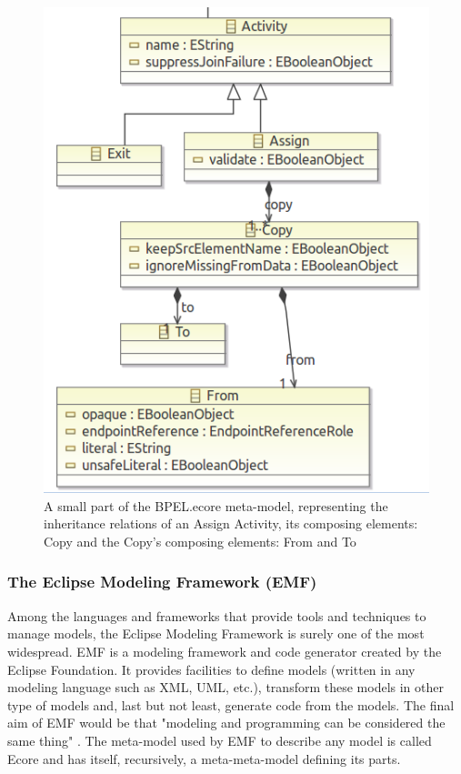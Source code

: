 \begin{figure}
  \begin{center}
    \includegraphics[scale=0.5]{pictures/BPELMetaModelExample.png}
    \caption{A small part of the BPEL.ecore meta-model, representing the inheritance relations of an Assign Activity, its composing elements: Copy and the Copy's composing elements: From and To}
    \label{BPELEcoreExample}
  \end{center}
\end{figure}

\subsubsection{The Eclipse Modeling Framework (EMF)}
\label{EMF}
Among the languages and frameworks that provide tools and techniques to manage models, the Eclipse Modeling Framework is surely one of the most widespread. 
EMF is a modeling framework and code generator created by the Eclipse Foundation. It provides facilities to define models (written in any modeling language such as XML, UML, etc.), transform these models in other type of models and, last but not least, generate code from the models. The final aim of EMF would be that "modeling and programming can be considered the same thing" \cite{Steinberg2009EMF}. The meta-model used by EMF to describe any model is called Ecore and has itself, recursively, a meta-meta-model defining its parts. 

